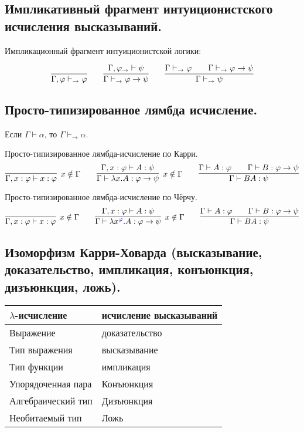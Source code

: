 \documentclass[10pt,a4paper,oneside]{article}
\begin{document}
\subsection{Импликативный фрагмент интуиционистского исчисления высказываний.}
  Импликационный фрагмент интуиционистской логики:

$$\infer{\Gamma,\varphi \vdash_\rightarrow \varphi}{} \quad\quad 
  \infer{\Gamma\vdash_\rightarrow\varphi\rightarrow\psi}{\Gamma,\varphi_\rightarrow\vdash\psi} \quad\quad 
  \infer{\Gamma\vdash_\rightarrow\psi}{\Gamma\vdash_\rightarrow\varphi\quad\quad\Gamma\vdash_\rightarrow\varphi\rightarrow\psi}$$


\subsection{Просто-типизированное лямбда исчисление.}
 Если $\Gamma\vdash\alpha$, то $\Gamma\vdash_\rightarrow\alpha$.

Просто-типизированное лямбда-исчисление по Карри.
$$\infer[x \notin \Gamma]{\Gamma,x:\varphi \vdash x:\varphi}{} \quad\quad 
  \infer[x \notin \Gamma]{\Gamma\vdash \lambda x.A: \varphi\rightarrow\psi}{\Gamma,x:\varphi\vdash A:\psi} \quad\quad 
  \infer{\Gamma\vdash B A:\psi}{\Gamma\vdash A:\varphi\quad\quad\Gamma\vdash B:\varphi\rightarrow\psi}$$

\noindent Просто-типизированное лямбда-исчисление по Чёрчу. 
$$\infer[x \notin \Gamma]{\Gamma,x:\varphi \vdash x:\varphi}{} \quad\quad 
  \infer[x \notin \Gamma]{\Gamma\vdash \lambda x^{\color{blue}\varphi}.A: \varphi\rightarrow\psi}{\Gamma,x:\varphi\vdash A:\psi} \quad\quad 
  \infer{\Gamma\vdash B A:\psi}{\Gamma\vdash A:\varphi\quad\quad\Gamma\vdash B:\varphi\rightarrow\psi}$$

\subsection{Изоморфизм Карри-Ховарда (высказывание, доказательство, импликация, конъюнкция, дизъюнкция, ложь).}

\begin{tabular}{ll}
$\lambda$-исчисление & исчисление высказываний\\\hline
Выражение & доказательство\\
Тип выражения & высказывание\\
Тип функции & импликация\\
Упорядоченная пара & Конъюнкция\\
Алгебраический тип & Дизъюнкция\\
Необитаемый тип & Ложь
\end{tabular}
\end{document}
